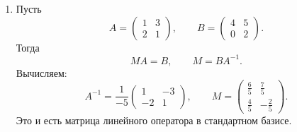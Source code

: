 \begin{enumerate}
Из системы
\[
\hat e_1=\begin{pmatrix}4\\3\end{pmatrix},\qquad
\hat e_2=\begin{pmatrix}1\\1\end{pmatrix}
\]
и
\[
e_1=\begin{pmatrix}3\\1\end{pmatrix},\qquad
e_2=\begin{pmatrix}2\\-1\end{pmatrix}
\]
получаем:
\[
\hat e_1=2e_1-e_2,\qquad
\hat e_2=\frac35\,e_1-\frac25\,e_2.
\]
Следовательно, матрица перехода от координат в базисе \((\hat e_1,\hat e_2)\) к координатам в базисе \((e_1,e_2)\) равна
\[
P=\begin{pmatrix}
2&\dfrac35\\
-1&-\dfrac25
\end{pmatrix}.
\]
Если в базисе \(e_1,e_2\) оператор имеет матрицу
\[
A=\begin{pmatrix}
-1&1\\
-3&4
\end{pmatrix},
\]
то в базисе \(\hat e_1,\hat e_2\) его матрица равна
\[
\hat A=P^{-1}AP
=
\begin{pmatrix}
-36&-\dfrac{61}{5}\\
115&39
\end{pmatrix}.
\]

\item
Пусть
\[
A=\begin{pmatrix}1&3\\2&1\end{pmatrix},\qquad
B=\begin{pmatrix}4&5\\0&2\end{pmatrix}.
\]
Тогда
\[
M A=B,\qquad M=BA^{-1}.
\]
Вычисляем:
\[
A^{-1}=\frac1{-5}\begin{pmatrix}1&-3\\-2&1\end{pmatrix},
\qquad
M=\begin{pmatrix}\frac65&\frac75\\[2mm]\frac45&-\frac25\end{pmatrix}.
\]
Это и есть матрица линейного оператора в стандартном базисе.


\end{enumerate}
